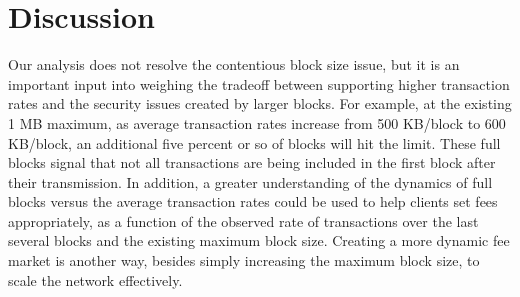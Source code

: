 \documentclass{article}
\begin{document}



\section{Discussion}
Our analysis does not resolve the contentious block size issue, but it is an important input into weighing the tradeoff between supporting higher transaction rates and the security issues created by larger blocks. For example, at the existing 1 MB maximum, as average transaction rates increase from 500 KB/block to 600 KB/block, an additional five percent or so of blocks will hit the limit. These full blocks signal that not all transactions are being included in the first block after their transmission. In addition, a greater understanding of the dynamics of full blocks versus the average transaction rates could be used to help clients set fees appropriately, as a function of the observed rate of transactions over the last several blocks and the existing maximum block size. Creating a more dynamic fee market is another way, besides simply increasing the maximum block size, to scale the network effectively.

 

\end{document}
